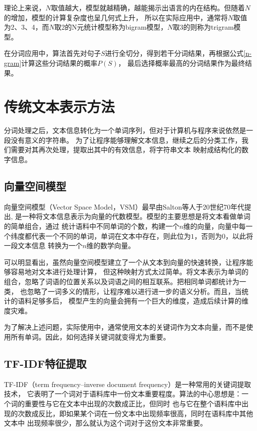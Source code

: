 理论上来说，$N$取值越大，模型就越精确，越能揭示出语言的内在结构。但随着$N$的增加，模型的计算复杂度也呈几何式上升，
所以在实际应用中，通常将$N$取值为2、3、4，而$N$取2的N元统计模型称为bigram模型，$N$取3的则称为trigram模型。

在分词应用中，算法首先对句子$S$进行全切分，得到若干分词结果，再根据公式\ref{n-gram}计算这些分词结果的概率$P\left ( S \right )$，
最后选择概率最高的分词结果作为最终结果。


\section{传统文本表示方法}
分词处理之后，文本信息转化为一个单词序列，但对于计算机与程序来说依然是一段没有意义的字符串。
为了让程序能够理解文本信息，继续之后的分类工作，我们需要对其再次处理，提取出其中的有效信息，将字符串文本
映射成结构化的数字信息。

\subsection{向量空间模型}

向量空间模型（Vector Space Model，VSM）最早由Salton等人于20世纪70年代提出,
是一种将文本信息表示为向量的代数模型。模型的主要思想是将文本看做单词的简单组合，通过
统计语料中不同单词的个数，构建一个$n$维的向量，向量中每一个纬度都代表一个不同的单词，单词在文本中存在，则此位为$1$，否则为$0$，以此将一段文本信息
转换为一个$n$维的数学向量。

可以明显看出，虽然向量空间模型建立了一个从文本到向量的快速转换，让程序能够容易地对文本进行处理计算，
但这种映射方式太过简单。将文本表示为单词的组合，忽略了词语的位置关系以及词语之间的相互联系。把相同单词都统计为一类，
也忽略了一词多义的情形，让程序难以进行进一步的语义分析。而且，当统计的语料足够多后，
模型产生的向量会拥有一个巨大的维度，造成后续计算的维度灾难。

为了解决上述问题，实际使用中，通常使用文本的关键词作为文本向量，而不是使用所有单词。因此，如何选择关键词就变得尤为重要。


\subsection{TF-IDF特征提取}

TF-IDF（term frequency–inverse document frequency）是一种常用的关键词提取技术，
它表明了一个词对于语料库中一份文本重要程度。算法的中心思想是：一个词的重要性与它在文本中出现的次数成正比，但同时
也与它在整个语料库中出现的次数成反比，即如果某个词在一份文本中出现频率很高，同时在语料库中其他文本中
出现频率很少，那么就认为这个词对于这份文本非常重要。

